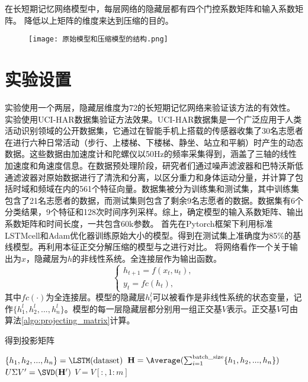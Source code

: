 在长短期记忆网络模型中，每层网络的隐藏层都有四个门控系数矩阵和输入系数矩阵。
降低以上矩阵的维度来达到压缩的目的。

\begin{figure}[!htbp]
  \centering
  \texttt{[image: 原始模型和压缩模型的结构.png]}
  \label{fig:原始模型和压缩模型的结构}
\end{figure}
\section{实验设置}
实验使用一个两层，隐藏层维度为72的长短期记忆网络来验证该方法的有效性。
实验使用UCI-HAR数据集\cite{anguitaHumanActivityRecognition2012}验证方法效果。UCI-HAR数据集是一个广泛应用于人类活动识别领域的公开数据集，它通过在智能手机上搭载的传感器收集了30名志愿者在进行六种日常活动（步行、上楼梯、下楼梯、静坐、站立和平躺）时产生的动态数据。这些数据由加速度计和陀螺仪以50Hz的频率采集得到，涵盖了三轴的线性加速度和角速度信息。在数据预处理阶段，研究者们通过噪声滤波器和巴特沃斯低通滤波器对原始数据进行了清洗和分离，以区分重力和身体运动分量，并计算了包括时域和频域在内的561个特征向量。数据集被分为训练集和测试集，其中训练集包含了21名志愿者的数据，而测试集则包含了剩余9名志愿者的数据。数据集有6个分类结果，9个特征和128次时间序列采样。综上，确定模型的输入系数矩阵、输出系数矩阵和时间长度，一共包含60k参数。
首先在Pytorch框架下利用标准LSTMcell和Adam优化器训练原始大小的模型。得到在测试集上准确度为85\%的基线模型。再利用本征正交分解压缩的模型与之进行对比。
将网络看作一个关于输出为$x$，隐藏层为$h$的非线性系统。全连接层作为输出函数。
\begin{equation}
  \label{eq:20}
\left\{ \begin{array}{l}
  {h_{t + 1}} = f({x_t},{u_t}),\\
  {y_t} = fc({h_t}),
  \end{array} \right.
\end{equation}
其中$fc( \cdot )$为全连接层。模型的隐藏层$h_i^l$可以被看作是非线性系统的状态变量，记作$\{ h_1^l,h_2^l,...,h_n^l\}$。模型的每一层隐藏层都分别用一组正交基$V$表示。正交基$V$可由算法\ref{algo:projecting_matrix}计算。
\begin{algorithm}[!htbp]
  \caption{得到投影矩阵}
  \label{algo:projecting_matrix}
  \DontPrintSemicolon
  
  
  \vspace{5pt}
  
  $\{h_1, h_2, ..., h_n\} = \LSTM(\text{dataset})$\;
  $\mathbf{H} = \Average(\sum_{i=1}^{\text{batch\_size}} \{h_1, h_2, ..., h_n\})$\;
  $U \Sigma V' = \SVD(\mathbf{H}')$\;
  $V = V[:, 1:m]$\;
  
\end{algorithm}

